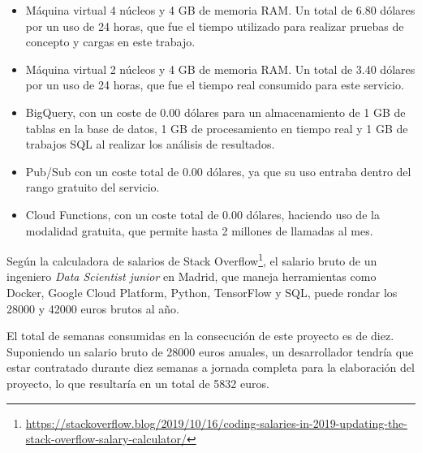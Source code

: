 \begin{itemize}
    \item Máquina virtual 4 núcleos y 4 GB de memoria RAM. Un total de 6.80 dólares por un uso de 24 horas, que fue el tiempo utilizado para realizar pruebas de concepto y cargas en este trabajo.
    \item Máquina virtual 2 núcleos y 4 GB de memoria RAM. Un total de 3.40 dólares por un uso de 24 horas, que fue el tiempo real consumido para este servicio.
    \item BigQuery, con un coste de 0.00 dólares para un almacenamiento de 1 GB de tablas en la base de datos, 1 GB de procesamiento en tiempo real y 1 GB de trabajos SQL al realizar los análisis de resultados.
    \item Pub/Sub con un coste total de 0.00 dólares, ya que su uso entraba dentro del rango gratuito del servicio.
    \item Cloud Functions, con un coste total de 0.00 dólares, haciendo uso de la modalidad gratuita, que permite hasta 2 millones de llamadas al mes.
\end{itemize}

Según la calculadora de salarios de Stack Overflow\footnote{\scriptsize\url{https://stackoverflow.blog/2019/10/16/coding-salaries-in-2019-updating-the-stack-overflow-salary-calculator/}}, el salario bruto de un ingeniero \textit{Data Scientist} \textit{junior} en Madrid, que maneja herramientas como Docker, Google Cloud Platform, Python, TensorFlow y SQL, puede rondar los 28000 y 42000 euros brutos al año.

El total de semanas consumidas en la consecución de este proyecto es de diez.
Suponiendo un salario bruto de 28000 euros anuales, un desarrollador tendría que estar contratado durante diez semanas a jornada completa para la elaboración del proyecto, lo que resultaría en un total de 5832 euros.

